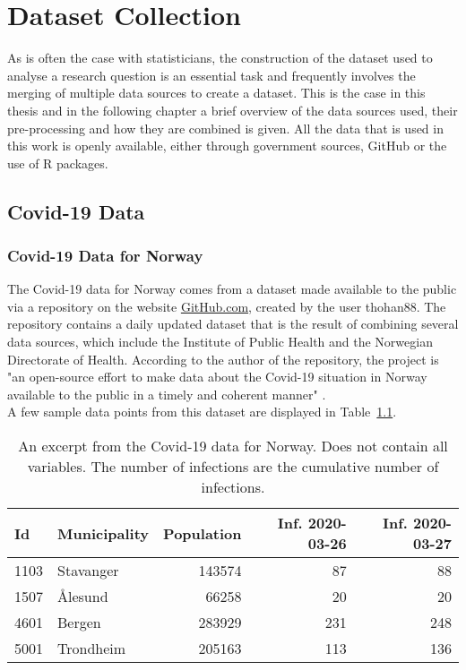 %
\chapter{Dataset Collection}
As is often the case with statisticians, the construction of the dataset used to analyse a research question is an essential task and frequently involves the merging of multiple data sources to create a dataset. This is the case in this thesis and in the following chapter a brief overview of the data sources used, their pre-processing and how they are combined is given. All the data that is used in this work is openly available, either through government sources, GitHub or the use of R packages.
\label{sec:datacollection}
\clearpage
\section{Covid-19 Data}
\subsection{Covid-19 Data for Norway}
The Covid-19 data for Norway comes from a dataset made available to the public via a repository on the website \href{https://www.github.com}{GitHub.com}, created by the user thohan88. The repository contains a daily updated dataset that is the result of combining several data sources, which include the Institute of Public Health and the Norwegian Directorate of Health. According to the author of the repository, the project is "an open-source effort to make data about the Covid-19 situation in Norway available to the public in a timely and coherent manner" \autocite[][]{thohan88}. \\
A few sample data points from this dataset are displayed in Table~\ref{datasetNorge}.\\
\begin{table}[H] 
\caption{An excerpt from the Covid-19 data for Norway. Does not contain all variables. The number of infections are the cumulative number of infections. \label{datasetNorge}}
\begin{tabular}{l l r r r}
\toprule
\textbf{Id}	& \textbf{Municipality}	& \textbf{Population}	& \textbf{Inf. 2020-03-26}	& \textbf{Inf. 2020-03-27}\\
\midrule
1103 & Stavanger & 143574 & 87 & 88 \\
1507 & Ålesund & 66258 & 20 & 20 \\
4601 & Bergen & 283929 & 231 & 248 \\
5001 & Trondheim & 205163 & 113 & 136 \\
\bottomrule
\end{tabular}
\end{table}
